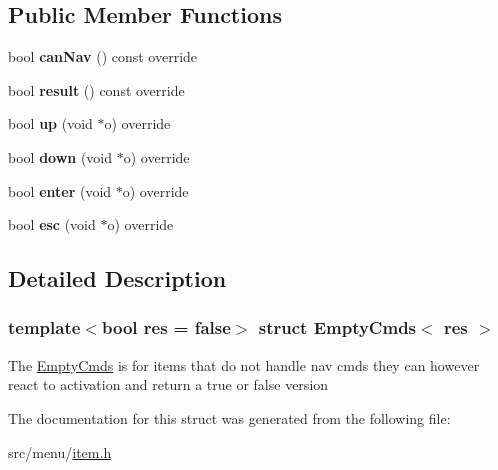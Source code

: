 \subsection*{Public Member Functions}
\begin{DoxyCompactItemize}
\item 
\mbox{\label{structEmptyCmds_a0c3644ab3bce97618cf62eb269fdde6d}} 
bool {\bfseries can\+Nav} () const override
\item 
\mbox{\label{structEmptyCmds_abcccf9ad7e43d948655938c44b486fa4}} 
bool {\bfseries result} () const override
\item 
\mbox{\label{structEmptyCmds_a3769acda346c1b467fbb6e37b80a5ba4}} 
bool {\bfseries up} (void $\ast$o) override
\item 
\mbox{\label{structEmptyCmds_aae723180d4a49785ad9ad1c3ea644b77}} 
bool {\bfseries down} (void $\ast$o) override
\item 
\mbox{\label{structEmptyCmds_ac79a9fecb8905fbd187c38123f76e64f}} 
bool {\bfseries enter} (void $\ast$o) override
\item 
\mbox{\label{structEmptyCmds_a6c8bf3dc7a1033fdfe06d79c285f0bd0}} 
bool {\bfseries esc} (void $\ast$o) override
\end{DoxyCompactItemize}


\subsection{Detailed Description}
\subsubsection*{template$<$bool res = false$>$\newline
struct Empty\+Cmds$<$ res $>$}

The \hyperlink{structEmptyCmds}{Empty\+Cmds} is for items that do not handle nav cmds they can however react to activation and return a true or false version 

The documentation for this struct was generated from the following file\+:\begin{DoxyCompactItemize}
\item 
src/menu/\hyperlink{item_8h}{item.\+h}\end{DoxyCompactItemize}

